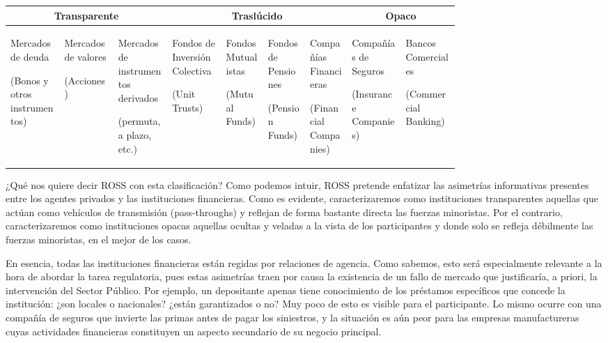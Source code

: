 \documentclass[10pt,a4paper]{article}
\begin{document}
\begin{center}
\begin{tabular}{|p{0.09\linewidth}|p{0.09\linewidth}|p{0.09\linewidth}|p{0.09\linewidth}|p{0.07\linewidth}|p{0.07\linewidth}|p{0.07\linewidth}|p{0.09\linewidth}|p{0.09\linewidth}|}
\hline
\multicolumn{3}{|c|}{\textbf{Transparente}} &
\multicolumn{4}{|c|}{\textbf{Traslúcido}} &
\multicolumn{2}{c|}{\textbf{Opaco}}\\
\hline
\parbox{1\linewidth}{\centering\scriptsize Mercados de deuda\par\tiny(Bonos y otros instrumentos)} &
\parbox{1\linewidth}{\centering\scriptsize Mercados de valores\par\tiny(Acciones)} &
\parbox{1\linewidth}{\centering\scriptsize Mercados de instrumentos derivados\par\tiny(permuta, a plazo, etc.)} &
\parbox{1\linewidth}{\centering\scriptsize Fondos de Inversión Colectiva\par\tiny(Unit Trusts)} &
\parbox{1\linewidth}{\centering\scriptsize Fondos Mutualistas\par\tiny(Mutual Funds)} &
\parbox{1\linewidth}{\centering\scriptsize Fondos de Pensiones\par\tiny(Pension Funds)} &
\parbox{1\linewidth}{\centering\scriptsize Compañías Financieras\par\tiny(Financial Companies)} &
\parbox{1\linewidth}{\centering\scriptsize Compañías de Seguros\par\tiny(Insurance Companies)} &
\parbox{1\linewidth}{\centering\scriptsize Bancos Comerciales\par\tiny(Commercial Banking)}\\
\hline
\end{tabular}
\end{center}

¿Qué nos quiere decir ROSS con esta clasificación? Como podemos intuir, ROSS pretende enfatizar las asimetrías informativas presentes entre los agentes privados y las instituciones financieras. Como es evidente, caracterizaremos como instituciones transparentes aquellas que actúan como vehículos de transmisión (pass-throughs) y reflejan de forma bastante directa las fuerzas minoristas. Por el contrario, caracterizaremos como instituciones opacas aquellas ocultas y veladas a la vista de los participantes y donde solo se refleja débilmente las fuerzas minoristas, en el mejor de los casos. 

En esencia, todas las instituciones financieras están regidas por relaciones de agencia. Como sabemos, esto será especialmente relevante a la hora de abordar la tarea regulatoria, pues estas asimetrías traen por causa la existencia de un fallo de mercado que justificaría, a priori, la intervención del Sector Público. Por ejemplo, un depositante apenas tiene conocimiento de los préstamos específicos que concede la institución: ¿son locales o nacionales? ¿están garantizados o no? Muy poco de esto es visible para el participante. Lo mismo ocurre con una compañía de seguros que invierte las primas antes de pagar los siniestros, y la situación es aún peor para las empresas manufactureras cuyas actividades financieras constituyen un aspecto secundario de su negocio principal. 
\end{document}
